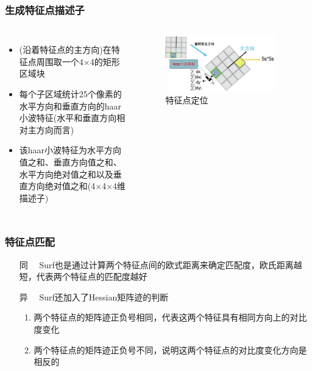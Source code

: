 \documentclass[presentation,aspectratio=1610]{beamer}
\begin{document}
\begin{frame}
	\frametitle{生成特征点描述子}
			\begin{columns}
				\begin{itemize}
					\item (沿着特征点的主方向)在特征点周围取一个4$\times$4的矩形区域块
					\item 每个子区域统计25个像素的水平方向和垂直方向的haar小波特征(水平和垂直方向相对主方向而言)
					\item 	该haar小波特征为水平方向值之和、垂直方向值之和、水平方向绝对值之和以及垂直方向绝对值之和(4$\times$4$\times$4维描述子)				
				\end{itemize}

				\begin{figure}[htbp!]
					\centering
					\includegraphics[width=0.9\textwidth]{img/miaoshu.jpg}
					\caption{特征点定位}
				\end{figure}
			\end{columns}
\end{frame}

\begin{frame}
	\frametitle{特征点匹配}
	\begin{enumerate}
		\item[同]　Surf也是通过计算两个特征点间的欧式距离来确定匹配度，欧氏距离越短，代表两个特征点的匹配度越好\\
		\item[异]　Surf还加入了Hessian矩阵迹的判断
		
		\begin{enumerate}
			\item 两个特征点的矩阵迹正负号相同，代表这两个特征具有相同方向上的对比度变化\\
			\item 两个特征点的矩阵迹正负号不同，说明这两个特征点的对比度变化方向是相反的
		\end{enumerate}
	\end{enumerate}
\end{frame}
\end{document}
